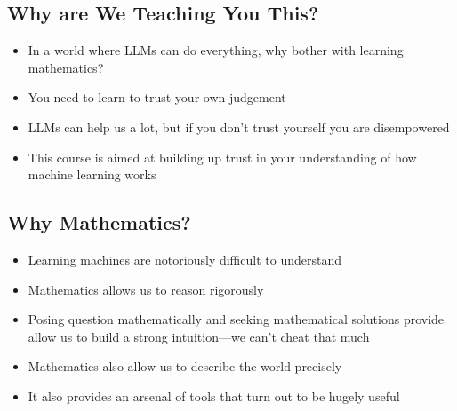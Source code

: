 
\begin{slide}
  \section{Why are We Teaching You This?}
  
\begin{PauseHighLight}
  \begin{itemize}
  \item In a world where LLMs can do everything, why bother with
    learning mathematics?\pause
  \item You need to learn to trust your own judgement\pauseb
  \item LLMs can help us a lot, but if you don't trust yourself you
    are disempowered\pauseb
  \item This course is aimed at building up trust in your
    understanding of how machine learning works\pauseb
  \end{itemize}
\end{PauseHighLight}

\end{slide}


\begin{slide}
\section{Why Mathematics?}

\begin{PauseHighLight}
  \begin{itemize}
  \item Learning machines are notoriously difficult to
    understand\pause
  \item Mathematics allows us to reason rigorously\pause
  \item Posing question mathematically and seeking mathematical
    solutions provide allow us to build a strong intuition\pause---we
    can't cheat\pauseb{} that much\pauseb
  \item Mathematics also allow us to describe the world
    precisely\pause
  \item It also provides an arsenal of tools that turn out to be hugely
    useful\pause
  \end{itemize}
\end{PauseHighLight}

\end{slide}

